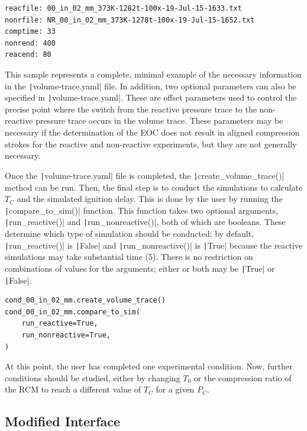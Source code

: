 \documentclass[12pt]{../ussci}
\begin{document}
\begin{verbatim}
reacfile: 00_in_02_mm_373K-1282t-100x-19-Jul-15-1633.txt
nonrfile: NR_00_in_02_mm_373K-1278t-100x-19-Jul-15-1652.txt
comptime: 33
nonrend: 400
reacend: 80
\end{verbatim}

This sample represents a complete, minimal example of the necessary
information in the \texttt|volume-trace.yaml| file. In addition, two
optional parameters can also be specified in \texttt|volume-trace.yaml|.
These are offset parameters used to control the precise point where the
switch from the reactive pressure trace to the non-reactive pressure
trace occurs in the volume trace. These parameters may be necessary if
the determination of the EOC does not result in aligned compression
strokes for the reactive and non-reactive experiments, but they are not
generally necessary.

Once the \texttt|volume-trace.yaml| file is completed, the
\texttt|create_volume_trace()| method can be run. Then, the final step
is to conduct the simulations to calculate \(T_C\) and the simulated
ignition delay. This is done by the user by running the
\texttt|compare_to_sim()| function. This function takes two optional
arguments, \texttt|run_reactive()| and \texttt|run_nonreactive()|,
both of which are booleans. These determine which type of simulation
should be conducted; by default, \texttt|run_reactive()| is
\texttt|False| and \texttt|run_nonreactive()| is \texttt|True| because
the reactive simulations may take substantial time (\SI{5}{\min}).
There is no restriction on combinations of values for the
arguments; either or both may be \texttt|True| or \texttt|False|.

\begin{verbatim}
cond_00_in_02_mm.create_volume_trace()
cond_00_in_02_mm.compare_to_sim(
    run_reactive=True,
    run_nonreactive=True,
)
\end{verbatim}

At this point, the user has completed one experimental condition. Now,
further conditions should be studied, either by changing \(T_0\) or the
compression ratio of the RCM to reach a different value of \(T_C\) for a
given \(P_C\).

\subsection{Modified Interface}\label{modified-interface}
\end{document}
